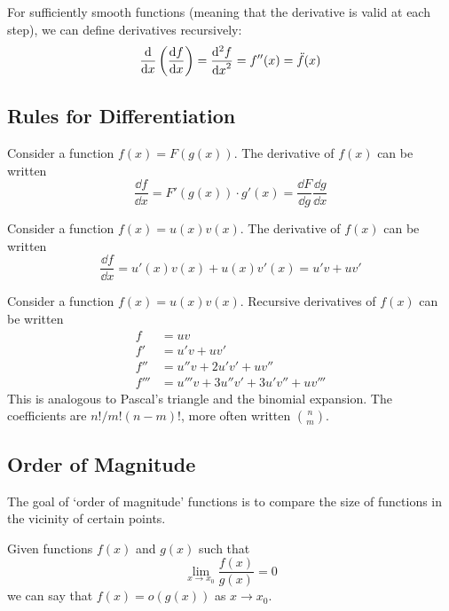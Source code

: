 For sufficiently smooth functions (meaning that the derivative is valid at each step), we can define derivatives recursively:
\[
	\frac{\mathrm{d}}{\dd{x}}\left( \frac{\dd{f}}{\dd{x}} \right)
	= \frac{\mathrm{d}^2f}{\dd{x}^2}
	= f''(x) = \ddot f (x)
\]

\subsection{Rules for Differentiation}
\begin{definition}
	Consider a function $f(x) = F(g(x))$. The derivative of $f(x)$ can be written
	\begin{equation}
		\frac{\dd{f}}{\dd{x}} = F'(g(x)) \cdot g'(x) = \frac{\dd{F}}{\dd{g}} \frac{\dd{g}}{\dd{x}}
	\end{equation}
\end{definition}

\begin{definition}
	Consider a function $f(x) = u(x)v(x)$. The derivative of $f(x)$ can be written
	\begin{equation}
		\frac{\dd{f}}{\dd{x}} = u'(x)v(x) + u(x)v'(x) = u'v + uv'
	\end{equation}
\end{definition}

\begin{definition}
	Consider a function $f(x) = u(x)v(x)$. Recursive derivatives of $f(x)$ can be written
	\begin{align}
		f    & = uv                                        \\
		f'   & = u'v + uv' \nonumber                       \\
		f''  & = u''v + 2u'v' + uv'' \nonumber             \\
		f''' & = u'''v + 3u''v' + 3u'v'' + uv''' \nonumber
	\end{align}
	This is analogous to Pascal's triangle and the binomial expansion. The coefficients are $n!/m!(n-m)!$, more often written $n \choose m$.
\end{definition}

\subsection{Order of Magnitude}
The goal of `order of magnitude' functions is to compare the size of functions in the vicinity of certain points.
\begin{definition}[Little $o$]
	Given functions $f(x)$ and $g(x)$ such that
	\begin{equation}
		\lim\limits_{x \to x_0} \frac{f(x)}{g(x)} = 0
	\end{equation}
	we can say that $f(x) = o(g(x))$ as $x \to x_0$.
\end{definition}


